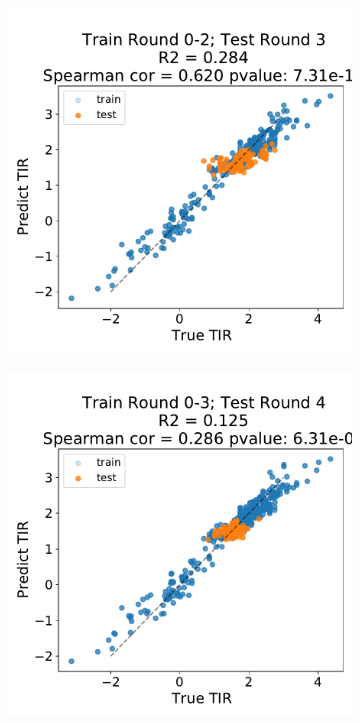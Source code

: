 \begin{figure}[!ht]
\begin{subfigure}[b]{0.49\textwidth}
    \end{subfigure}
    \begin{subfigure}[b]{0.49\textwidth}
        \centering
        \caption{}
        \includegraphics[scale=0.4]{plots/Supplementary/scatter_abc1_FF_2_salis.pdf}
    \end{subfigure}
    \begin{subfigure}[b]{0.49\textwidth}
        \centering
        \caption{}
        \includegraphics[scale=0.4]{plots/Supplementary/scatter_abc1_FF_3_salis.pdf}

\end{subfigure}
\end{figure}
